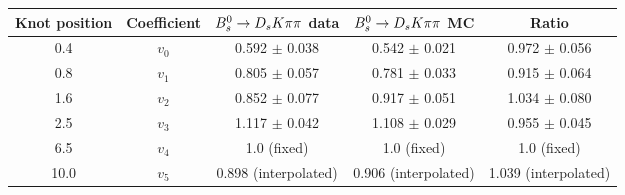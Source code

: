 \begin{tabular}{c c c c c}
\hline
\hline
Knot position & Coefficient & ${{B}^0_{s}}\rightarrow{\ensuremath{{D}_{s}}}{\ensuremath{K}}{\ensuremath{\pi}}{\ensuremath{\pi}}$ data & ${{B}^0_{s}}\rightarrow{\ensuremath{{D}_{s}}}{\ensuremath{K}}{\ensuremath{\pi}}{\ensuremath{\pi}}$ MC & Ratio \\
\hline
0.4 & $v_{0}$ & 0.592 $\pm$ 0.038 & 0.542 $\pm$ 0.021 & 0.972 $\pm$ 0.056\\
0.8 & $v_{1}$ & 0.805 $\pm$ 0.057 & 0.781 $\pm$ 0.033 & 0.915 $\pm$ 0.064\\
1.6 & $v_{2}$ & 0.852 $\pm$ 0.077 & 0.917 $\pm$ 0.051 & 1.034 $\pm$ 0.080\\
2.5 & $v_{3}$ & 1.117 $\pm$ 0.042 & 1.108 $\pm$ 0.029 & 0.955 $\pm$ 0.045\\
6.5 & $v_{4}$ &  1.0 (fixed) & 1.0 (fixed) & 1.0 (fixed)\\
10.0 & $v_{5}$ & 0.898 (interpolated) & 0.906 (interpolated) & 1.039 (interpolated) \\
\hline
\hline
\end{tabular}
